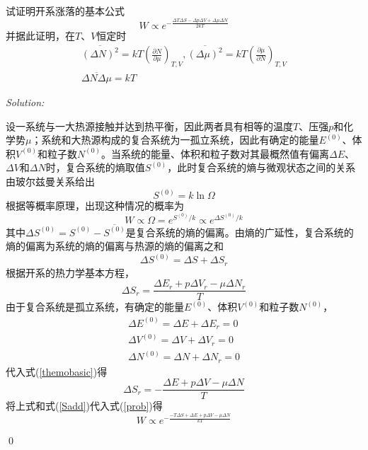 \documentclass[12pt,a4paper]{article}
\newenvironment{problem}[2][Problem]{\begin{trivlist}
\item[\hskip \labelsep {\bfseries #1}\hskip \labelsep {\bfseries #2.}]}{\end{trivlist}}
\newenvironment{sol}
    {\emph{Solution:}
    }
    {
    \qed
    }
\begin{document}
\begin{problem}{10.3}
试证明开系涨落的基本公式
\[
W\propto e^{-\frac{\Delta T\Delta S-\Delta p\Delta V+\Delta\mu\Delta N}{2kT}}
\]
并据此证明，在$T$、$V$恒定时
\begin{gather*}
\overline{(\Delta N)^2}=kT\left(\frac{\partial N}{\partial\mu}\right)_{T,V},\overline{(\Delta\mu)^2}=kT\left(\frac{\partial\mu}{\partial N}\right)_{T,V}\\
\overline{\Delta N\Delta\mu}=kT
\end{gather*}
\end{problem}
\begin{sol}
设一系统与一大热源接触并达到热平衡，因此两者具有相等的温度$T$、压强$p$和化学势$\mu$；系统和大热源构成的复合系统为一孤立系统，因此有确定的能量$E^{(0)}$、体积$V^{(0)}$和粒子数$N^{(0)}$。当系统的能量、体积和粒子数对其最概然值有偏离$\Delta E$、$\Delta V$和$\Delta N$时，复合系统的熵取值$S^{(0)}$，此时复合系统的熵与微观状态之间的关系由玻尔兹曼关系给出
\begin{equation}
S^{(0)}=k\ln\Omega
\end{equation}
根据等概率原理，出现这种情况的概率为
\begin{equation}
\label{prob}
W\propto\Omega=e^{S^{(0)}/k}\propto e^{\Delta S^{(0)}/k}
\end{equation}
其中$\Delta S^{(0)}=S^{(0)}-\overline{S^{(0)}}$是复合系统的熵的偏离。由熵的广延性，复合系统的熵的偏离为系统的熵的偏离与热源的熵的偏离之和
\begin{equation}
\label{Sadd}
\Delta S^{(0)}=\Delta S+\Delta S_r
\end{equation}
根据开系的热力学基本方程，
\begin{equation}
\label{themobasic}
\Delta S_r=\frac{\Delta E_r+p\Delta V_r-\mu\Delta N_r}{T}
\end{equation}
由于复合系统是孤立系统，有确定的能量$E^{(0)}$、体积$V^{(0)}$和粒子数$N^{(0)}$，
\begin{gather}
\Delta E^{(0)}=\Delta E+\Delta E_r=0\\
\Delta V^{(0)}=\Delta V+\Delta V_r=0\\
\Delta N^{(0)}=\Delta N+\Delta N_r=0
\end{gather}
代入式(\ref{themobasic})得
\begin{equation}
\Delta S_r=-\frac{\Delta E+p\Delta V-\mu\Delta N}{T}
\end{equation}
将上式和式(\ref{Sadd})代入式(\ref{prob})得
\begin{equation}
\label{prob2}
W\propto e^{-\frac{-T\Delta S+\Delta E+p\Delta V-\mu\Delta N}{kT}}

\end{equation}
\end{sol}
\end{document}
